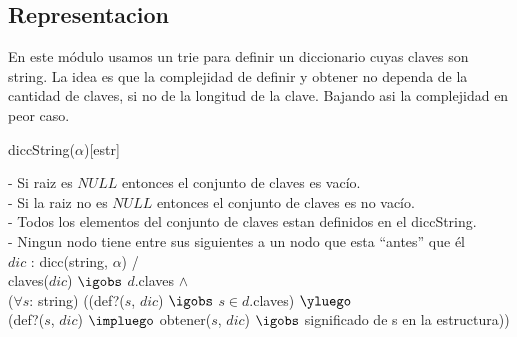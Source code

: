 \begin{Representacion}
\subsection{Representacion}


	En este m\'odulo usamos un trie para definir un diccionario cuyas claves son string.
$ $\newline La idea es que la complejidad de definir y obtener no dependa de la cantidad de claves, si no de la longitud de la clave. Bajando asi la complejidad en peor caso.

  \begin{Estructura}{diccString($\alpha$)}[estr]
    \begin{Tupla}[estr]
    \end{Tupla}

    \begin{Tupla}[nodo]
    \end{Tupla}
  \end{Estructura}



- Si raiz es $NULL$ entonces el conjunto de claves es vac\'io. \\
- Si la raiz no es $NULL$ entonces el conjunto de claves es no vac\'io. \\
- Todos los elementos del conjunto de claves estan definidos en el diccString. \\
- Ningun nodo tiene entre sus siguientes a un nodo que esta ``antes'' que \'el \\

%
{
$dic$ : dicc(string, $\alpha$) / \\
	claves($dic$) $\igobs$ $d$.claves $\land$ \\

	($\forall s$: string)
		((def?($s$, $dic$) $\igobs$ $s \in d$.claves)  $\yluego$ \\
		(def?($s$, $dic$) $\impluego$ obtener($s$, $dic$) $\igobs$ significado de s en la estructura))
}%

\end{Representacion}

